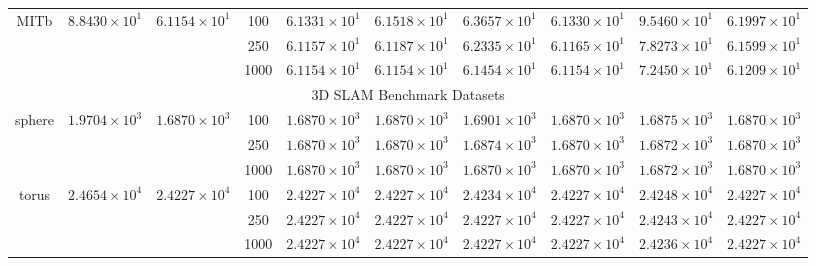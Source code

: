 \begin{table*}[t]
\begin{tabular}{|c||c|c||c|c|c||c|c|c|c|}
		\hline
		\multirow{3}{*}{\sf MITb} &\multirow{3}{*}{$8.8430\times 10^1$} &\multirow{3}{*}{$6.1154\times 10^1$}
    &100 & \color{blue}$6.1331\times10^1$ & $6.1518\times10^1$ & $6.3657\times10^1$ & \color{red}$6.1330\times10^1$ & $9.5460\times 10^1$ & $6.1997\times10^1$ \\
		\cline{4-10}
		& &
    &250 & \color{red}$6.1157\times10^1$ & $6.1187\times10^1$ & $6.2335\times10^1$ & \color{blue}$6.1165\times10^1$ & $7.8273\times 10^1$ & $6.1599\times10^1$ \\
		\cline{4-10}
		& &
    &1000 & \color{ao}$6.1154\times10^1$ & \color{ao}$6.1154\times10^1$ & $6.1454\times10^1$ & \color{ao}$6.1154\times10^1$ & $7.2450\times 10^1$ & $6.1209\times10^1$ \\
		\hline
    \multicolumn{10}{|c|}{{3D SLAM Benchmark Datasets}}\\
		\hline
    \multirow{3}{*}{\sf sphere} &\multirow{3}{*}{$1.9704\times 10^3$} &\multirow{3}{*}{$1.6870\times 10^3$}
    &100 & \color{ao}$1.6870\times 10^{3}$ & \color{ao}$1.6870\times 10^3$ & $1.6901\times 10^3$ & \color{ao}$1.6870\times 10^{3}$ & $1.6875\times 10^{3}$ & \color{ao}$1.6870\times 10^{3}$  \\
		\cline{4-10}
		& &
    &250 & \color{ao}$1.6870\times 10^{3}$ & \color{ao}$1.6870\times 10^3$ & $1.6874\times 10^3$ & \color{ao}$1.6870\times 10^{3}$ & $1.6872\times 10^{3}$ & \color{ao}$1.6870\times 10^{3}$  \\
		\cline{4-10}
		& &
    &1000 & \color{ao}$1.6870\times 10^{3}$ & \color{ao}$1.6870\times 10^3$ & \color{ao}$1.6870\times 10^3$ & \color{ao}$1.6870\times 10^{3}$ & $1.6872\times 10^{3}$ & \color{ao}$1.6870\times 10^{3}$  \\
		\hline
    \multirow{3}{*}{\sf torus} &\multirow{3}{*}{$2.4654\times 10^4$} &\multirow{3}{*}{$2.4227\times 10^4$}
    &100 & \color{ao}$2.4227\times 10^{4}$ & \color{ao}$2.4227\times 10^{4}$ & $2.4234\times 10^4$ & \color{ao}$2.4227\times 10^4$ & $2.4248\times 10^4$ & \color{ao}$2.4227\times 10^4$  \\
		\cline{4-10}
		& &
    &250 & \color{ao}$2.4227\times 10^{4}$ & \color{ao}$2.4227\times 10^{4}$ & \color{ao}$2.4227\times 10^4$ & \color{ao}$2.4227\times 10^4$ & $2.4243\times 10^4$ & \color{ao}$2.4227\times 10^4$  \\
		\cline{4-10}
		& &
    &1000 & \color{ao}$2.4227\times 10^{4}$ & \color{ao}$2.4227\times 10^{4}$ & \color{ao}$2.4227\times 10^4$ & \color{ao}$2.4227\times 10^4$ & $2.4236\times 10^4$ & \color{ao}$2.4227\times 10^4$  \\

\end{tabular}
\end{table*}
